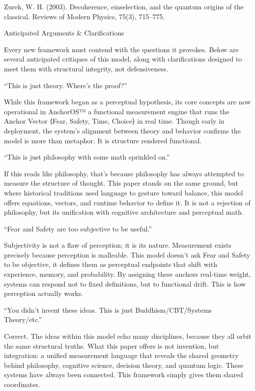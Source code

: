 \documentclass[11pt]{article}
\begin{document}
Zurek, W. H. (2003). Decoherence, einselection, and the quantum origins of the classical. Reviews of Modern Physics, 75(3), 715–775.

Anticipated Arguments & Clarifications

Every new framework must contend with the questions it provokes. Below are several anticipated critiques of this model, along with clarifications designed to meet them with structural integrity, not defensiveness.

“This is just theory. Where’s the proof?”

While this framework began as a perceptual hypothesis, its core concepts are now operational in AnchorOS™ a functional measurement engine that runs the Anchor Vector ⟨Fear, Safety, Time, Choice⟩ in real time. Though early in deployment, the system’s alignment between theory and behavior confirms the model is more than metaphor. It is structure rendered functional.

“This is just philosophy with some math sprinkled on.”

If this reads like philosophy, that’s because philosophy has always attempted to measure the structure of thought. This paper stands on the same ground, but where historical traditions used language to gesture toward balance, this model offers equations, vectors, and runtime behavior to define it. It is not a rejection of philosophy, but its unification with cognitive architecture and perceptual math.

“Fear and Safety are too subjective to be useful.”

Subjectivity is not a flaw of perception; it is its nature. Measurement exists precisely because perception is malleable. This model doesn’t ask Fear and Safety to be objective, it defines them as perceptual endpoints that shift with experience, memory, and probability. By assigning these anchors real-time weight, systems can respond not to fixed definitions, but to functional drift. This is how perception actually works.

“You didn’t invent these ideas. This is just Buddhism/CBT/Systems Theory/etc.”

Correct. The ideas within this model echo many disciplines, because they all orbit the same structural truths. What this paper offers is not invention, but integration: a unified measurement language that reveals the shared geometry behind philosophy, cognitive science, decision theory, and quantum logic. These systems have always been connected. This framework simply gives them shared coordinates.
\end{document}
